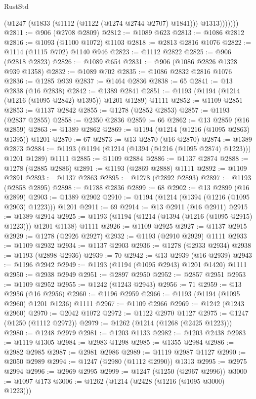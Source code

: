 \begin{lexlean}{RustStd}
\begin{coremodule}
                (@1247 (@1833 (@1112 (@1122 (@1274 @2744 @2707) @1841))) @1313)))))))
@2811 := @906 (@2708 @2809)
@2812 := @1089 @623
@2813 := @1086 @2812
@2816 := @1093 (@1100 @1072) @1103
@2818 := @2813 @2816 @1076
@2822 := @1114 (@1115 @702) @1140 @946
@2823 := @1112 @2822
@2825 := @906 (@2818 @2823)
@2826 := @1089 @654
@2831 := @906 (@1086 @2826 @1328 @939 @1358)
@2832 := @1089 @702
@2835 := @1086 @2832 @2816 @1076
@2836 := @1285 @939
@2837 := @1464 @2836
@2838 := 65
@2841 := @13 @2838 (@16 @2838)
@2842 := @1389 @2841
@2851 := @1193 (@1194 (@1214 (@1216 (@1095 @2842) @1395)) @1201 @1289) @1111
@2852 := @1109 @2851
@2853 := @1137 @2842
@2855 := @1278 (@2852 @2853)
@2857 := @1193 (@2837 @2855)
@2858 := @2350 @2836
@2859 := 66
@2862 := @13 @2859 (@16 @2859)
@2863 := @1389 @2862
@2869 := @1194 (@1214 (@1216 (@1095 @2863) @1395)) @1201
@2870 := 67
@2873 := @13 @2870 (@16 @2870)
@2874 := @1389 @2873
@2884 := @1193 (@1194 (@1214 (@1394 (@1216 (@1095 @2874) @1223))) @1201 @1289) @1111
@2885 := @1109 @2884
@2886 := @1137 @2874
@2888 := @1278 (@2885 @2886)
@2891 := @1193 (@2869 @2888) @1111
@2892 := @1109 @2891
@2893 := @1137 @2863
@2895 := @1278 (@2892 @2893)
@2897 := @1193 (@2858 @2895)
@2898 := @1788 @2836
@2899 := 68
@2902 := @13 @2899 (@16 @2899)
@2903 := @1389 @2902
@2910 := @1194 (@1214 (@1394 (@1216 (@1095 @2903) @1223))) @1201
@2911 := 69
@2914 := @13 @2911 (@16 @2911)
@2915 := @1389 @2914
@2925 := @1193 (@1194 (@1214 (@1394 (@1216 (@1095 @2915) @1223))) @1201 @1138) @1111
@2926 := @1109 @2925
@2927 := @1137 @2915
@2929 := @1278 (@2926 @2927)
@2932 := @1193 (@2910 @2929) @1111
@2933 := @1109 @2932
@2934 := @1137 @2903
@2936 := @1278 (@2933 @2934)
@2938 := @1193 (@2898 @2936)
@2939 := 70
@2942 := @13 @2939 (@16 @2939)
@2943 := @1196 @2942
@2949 := @1193 (@1194 (@1095 @2943) @1201 @1420) @1111
@2950 := @2938 @2949
@2951 := @2897 @2950
@2952 := @2857 @2951
@2953 := @1109 @2952
@2955 := @1242 (@1243 @2943)
@2956 := 71
@2959 := @13 @2956 (@16 @2956)
@2960 := @1196 @2959
@2966 := @1193 (@1194 (@1095 @2960) @1201 @1236) @1111
@2967 := @1109 @2966
@2969 := @1242 (@1243 @2960)
@2970 := @2042 @1072
@2972 := @1122 @2970 @1127
@2975 := @1247 (@1250 (@1112 @2972))
@2979 := @1262 (@1214 (@1268 (@2425 @1223)))
@2980 := @1248 @2979
@2981 := @1203 @1133
@2982 := @1203 @2438
@2983 := @1119 @1305
@2984 := @2983 @1298
@2985 := @1355 @2984
@2986 := @2982 @2985
@2987 := @2981 @2986
@2989 := @1119 @2987 @1127
@2990 := @2050 @2989
@2994 := @1247 (@2980 (@1112 @2990)) @1313
@2995 := @2975 @2994
@2996 := @2969 @2995
@2999 := @1247 (@1250 (@2967 @2996))
@3000 := @1097 @173
@3006 := @1262 (@1214 (@2428 (@1216 (@1095 @3000) @1223)))

\end{coremodule}
\end{lexlean}
